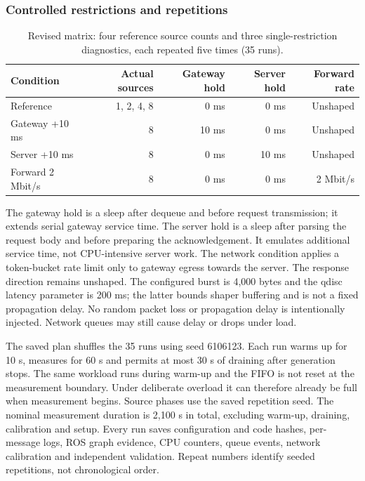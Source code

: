 \subsubsection{Controlled restrictions and repetitions}

\begin{table}[H]
\centering\small
\setlength{\tabcolsep}{4pt}
\begin{tabular}{lrrrr}
\hline
Condition & Actual sources & Gateway hold & Server hold & Forward rate \\
\hline
Reference & 1, 2, 4, 8 & 0 ms & 0 ms & Unshaped \\
Gateway +10 ms & 8 & 10 ms & 0 ms & Unshaped \\
Server +10 ms & 8 & 0 ms & 10 ms & Unshaped \\
Forward 2 Mbit/s & 8 & 0 ms & 0 ms & 2 Mbit/s \\
\hline
\end{tabular}
\caption{Revised matrix: four reference source counts and three single-restriction diagnostics, each repeated five times (35 runs).}
\label{tab:e1r-conditions}
\end{table}


The gateway hold is a sleep after dequeue and before request transmission; it extends serial gateway service time. The server hold is a sleep after parsing the request body and before preparing the acknowledgement. It emulates additional service time, not CPU-intensive server work. The network condition applies a token-bucket rate limit only to gateway egress towards the server. The response direction remains unshaped. The configured burst is 4,000 bytes and the qdisc latency parameter is 200 ms; the latter bounds shaper buffering and is not a fixed propagation delay. No random packet loss or propagation delay is intentionally injected. Network queues may still cause delay or drops under load.

The saved plan shuffles the 35 runs using seed 6106123. Each run warms up for 10 s, measures for 60 s and permits at most 30 s of draining after generation stops. The same workload runs during warm-up and the FIFO is not reset at the measurement boundary. Under deliberate overload it can therefore already be full when measurement begins. Source phases use the saved repetition seed. The nominal measurement duration is 2,100 s in total, excluding warm-up, draining, calibration and setup. Every run saves configuration and code hashes, per-message logs, ROS graph evidence, CPU counters, queue events, network calibration and independent validation. Repeat numbers identify seeded repetitions, not chronological order.

